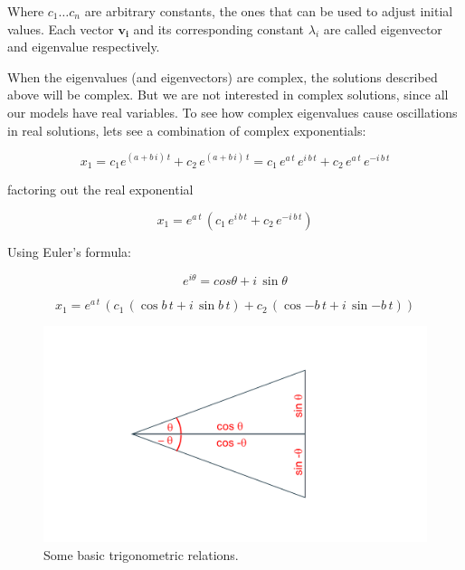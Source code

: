 \documentclass[12pt]{article}
\begin{document}
Where $c_1 \dots c_n$  are arbitrary constants, the ones that can be used to adjust initial values. Each vector $\mathbf{v_i}$ and its corresponding constant $\lambda_i$ are called eigenvector and eigenvalue respectively.


When the eigenvalues (and eigenvectors) are complex, the solutions described above will be complex. But we are not interested in complex solutions, since all our models have real variables. To see how complex eigenvalues cause oscillations in real solutions, lets see a combination of complex exponentials:

\begin{equation}
	x_1= c_1 e^{\left(  a + b\, i\right) \, t} + c_2 \,  e^{\left(  a + b\, i\right)\, t} = 
	c_1  \, e^{a \, t} \, e^{ i \, b \, t} + c_2 \,  e^{a \, t} \, e^{-i \, b \, t} 
	\nonumber
\end{equation}

factoring out the real exponential

\begin{equation}
x_1= e^{a \, t} \,  \left( c_1  \, e^{ i \, b \, t} + c_2 \,  e^{-i \, b \, t}\right) \nonumber
\end{equation}

Using Euler's formula:

\begin{equation}
	\label{euler}
	e^{i \theta} = cos \theta + i \, \sin \theta 
\end{equation}

\begin{equation}
	x_1= e^{a \, t} \,  \left( c_1  \, \left(  \cos{ b \, t} + i \, \sin{ b \, t} \right)+ c_2 \, \left( \cos{- b \, t} + i \, \sin{- b \, t} \right) \right) \nonumber
\end{equation}

\begin{figure}
\begin{center}
	\includegraphics[width=\textwidth]{trigo}
\end{center}
\caption{Some basic trigonometric relations.}
\label{fig:trigo}
\end{figure}
\end{document}
